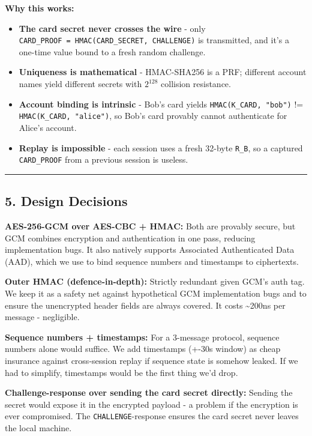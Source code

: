 \documentclass[
]{article}
\providecommand{\tightlist}{%
  \setlength{\itemsep}{0pt}\setlength{\parskip}{0pt}}
\begin{document}
\textbf{Why this works:}

\begin{itemize}
\tightlist
\item
  \textbf{The card secret never crosses the wire} - only
  \texttt{CARD\_PROOF\ =\ HMAC(CARD\_SECRET,\ CHALLENGE)} is
  transmitted, and it's a one-time value bound to a fresh random
  challenge.
\item
  \textbf{Uniqueness is mathematical} - HMAC-SHA256 is a PRF; different
  account names yield different secrets with \(2^{128}\) collision
  resistance.
\item
  \textbf{Account binding is intrinsic} - Bob's card yields
  \texttt{HMAC(K\_CARD,\ "bob")} != \texttt{HMAC(K\_CARD,\ "alice")}, so
  Bob's card provably cannot authenticate for Alice's account.
\item
  \textbf{Replay is impossible} - each session uses a fresh 32-byte
  \texttt{R\_B}, so a captured \texttt{CARD\_PROOF} from a previous
  session is useless.
\end{itemize}

\begin{center}\rule{0.5\linewidth}{0.5pt}\end{center}

\hypertarget{design-decisions}{%
\subsection{5. Design Decisions}\label{design-decisions}}

\textbf{AES-256-GCM over AES-CBC + HMAC:} Both are provably secure, but
GCM combines encryption and authentication in one pass, reducing
implementation bugs. It also natively supports Associated Authenticated
Data (AAD), which we use to bind sequence numbers and timestamps to
ciphertexts.

\textbf{Outer HMAC (defence-in-depth):} Strictly redundant given GCM's
auth tag. We keep it as a safety net against hypothetical GCM
implementation bugs and to ensure the unencrypted header fields are
always covered. It costs \textasciitilde200ns per message - negligible.

\textbf{Sequence numbers + timestamps:} For a 3-message protocol,
sequence numbers alone would suffice. We add timestamps (+-30s window)
as cheap insurance against cross-session replay if sequence state is
somehow leaked. If we had to simplify, timestamps would be the first
thing we'd drop.

\textbf{Challenge-response over sending the card secret directly:}
Sending the secret would expose it in the encrypted payload - a problem
if the encryption is ever compromised. The \texttt{CHALLENGE}-response ensures
the card secret never leaves the local machine.
\end{document}
